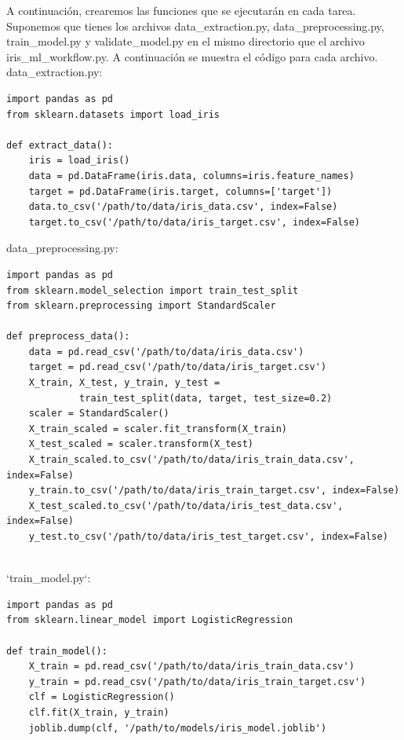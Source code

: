 \documentclass[11pt]{article}
\begin{document}
A continuación, crearemos las funciones que se ejecutarán en cada
tarea. Suponemos que tienes los archivos data\_extraction.py,
data\_preprocessing.py, train\_model.py y validate\_model.py en el mismo
directorio que el archivo iris\_ml\_workflow.py. A continuación se
muestra el código para cada archivo.
data\_extraction.py:
\begin{verbatim}
import pandas as pd
from sklearn.datasets import load_iris

def extract_data():
    iris = load_iris()
    data = pd.DataFrame(iris.data, columns=iris.feature_names)
    target = pd.DataFrame(iris.target, columns=['target'])
    data.to_csv('/path/to/data/iris_data.csv', index=False)
    target.to_csv('/path/to/data/iris_target.csv', index=False)

\end{verbatim}

data\_preprocessing.py:
\begin{verbatim}
import pandas as pd
from sklearn.model_selection import train_test_split
from sklearn.preprocessing import StandardScaler

def preprocess_data():
    data = pd.read_csv('/path/to/data/iris_data.csv')
    target = pd.read_csv('/path/to/data/iris_target.csv')
    X_train, X_test, y_train, y_test =
             train_test_split(data, target, test_size=0.2)
    scaler = StandardScaler()
    X_train_scaled = scaler.fit_transform(X_train)
    X_test_scaled = scaler.transform(X_test)
    X_train_scaled.to_csv('/path/to/data/iris_train_data.csv', index=False)
    y_train.to_csv('/path/to/data/iris_train_target.csv', index=False)
    X_test_scaled.to_csv('/path/to/data/iris_test_data.csv', index=False)
    y_test.to_csv('/path/to/data/iris_test_target.csv', index=False)


\end{verbatim}
`train\_model.py`:
\begin{verbatim}
import pandas as pd
from sklearn.linear_model import LogisticRegression

def train_model():
    X_train = pd.read_csv('/path/to/data/iris_train_data.csv')
    y_train = pd.read_csv('/path/to/data/iris_train_target.csv')
    clf = LogisticRegression()
    clf.fit(X_train, y_train)
    joblib.dump(clf, '/path/to/models/iris_model.joblib')
\end{verbatim}
\end{document}
